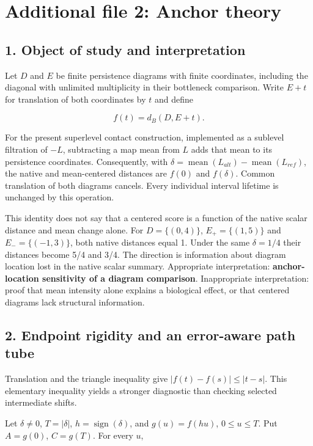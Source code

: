 \documentclass[
  11pt,
]{article}
\author{}
\date{}
\begin{document}
\section{Additional file 2: Anchor
theory}\label{additional-file-2-anchor-theory}

\subsection{1. Object of study and
interpretation}\label{object-of-study-and-interpretation}

Let \(D\) and \(E\) be finite persistence diagrams with finite
coordinates, including the diagonal with unlimited multiplicity in their
bottleneck comparison. Write \(E+t\) for translation of both coordinates
by \(t\) and define

\[
f(t)=d_B(D,E+t).
\]

For the present superlevel contact construction, implemented as a
sublevel filtration of \(-L\), subtracting a map mean from \(L\) adds
that mean to its persistence coordinates. Consequently, with
\(\delta=\operatorname{mean}(L_{alt})-\operatorname{mean}(L_{ref})\),
the native and mean-centered distances are \(f(0)\) and \(f(\delta)\).
Common translation of both diagrams cancels. Every individual interval
lifetime is unchanged by this operation.

This identity does not say that a centered score is a function of the
native scalar distance and mean change alone. For \(D=\{(0,4)\}\),
\(E_+=\{(1,5)\}\) and \(E_-=\{(-1,3)\}\), both native distances equal 1.
Under the same \(\delta=1/4\) their distances become 5/4 and 3/4. The
direction is information about diagram location lost in the native
scalar summary. Appropriate interpretation: \textbf{anchor-location
sensitivity of a diagram comparison}. Inappropriate interpretation:
proof that mean intensity alone explains a biological effect, or that
centered diagrams lack structural information.

\subsection{2. Endpoint rigidity and an error-aware path
tube}\label{endpoint-rigidity-and-an-error-aware-path-tube}

Translation and the triangle inequality give \(|f(t)-f(s)|\leq |t-s|\).
This elementary inequality yields a stronger diagnostic than checking
selected intermediate shifts.

Let \(\delta\ne 0\), \(T=|\delta|\), \(h=\operatorname{sign}(\delta)\),
and \(g(u)=f(hu)\), \(0\leq u\leq T\). Put \(A=g(0)\), \(C=g(T)\). For
every \(u\),
\end{document}
